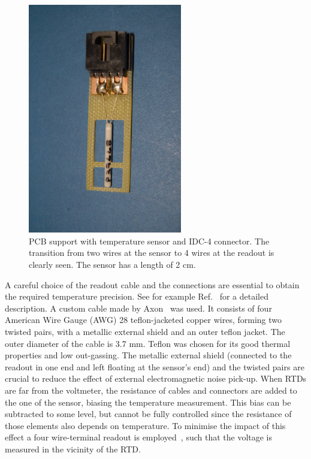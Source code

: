 \begin{figure}[htbp]
\begin{center}
\includegraphics[angle=-90, width=0.6\textwidth]{images/figure_1.jpg}%
\caption{PCB support with temperature sensor and IDC-4 connector. The transition from two wires at the sensor to 4 wires at the readout is clearly seen. The sensor has a length of 2 cm.
\label{fig:sensor}}
\end{center}
\end{figure}

A careful choice of the readout cable and the connections are essential to obtain the required temperature precision. See for example Ref.~\cite{minco} for a detailed description. A custom cable made by Axon~\cite{axon} was used. It consists of four American Wire Gauge (AWG) 28 teflon-jacketed copper wires, forming two twisted pairs, with a metallic external shield and an outer teflon jacket. The outer diameter of the cable is 3.7 mm. Teflon was chosen for its good thermal properties and low out-gassing. The metallic external shield (connected to the readout in one end and left floating at the sensor's end) and the twisted pairs are crucial to reduce the effect of external electromagnetic noise pick-up. When RTDs are far from the voltmeter, the resistance of cables and connectors are added to the one of the sensor, biasing the temperature measurement. This bias can be subtracted to some level, but cannot be fully controlled since the resistance of those elements also depends on temperature. To minimise the impact of this effect a four wire-terminal readout is employed~\cite{minco}, such that the voltage is measured in the vicinity of the RTD.

